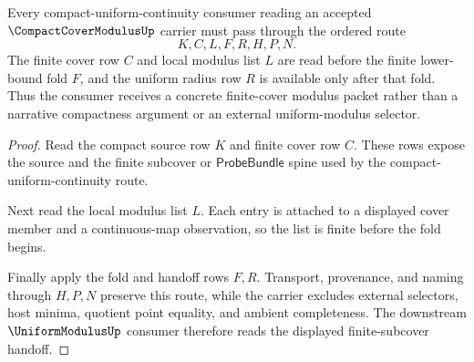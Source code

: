 \begin{theorem}
\label{thm:compact-cover-modulus-finite-subcover-handoff}
Every compact-uniform-continuity consumer reading an accepted $\CompactCoverModulusUp$ carrier must pass through the ordered route
$$
K,C,L,F,R,H,P,N .
$$
The finite cover row $C$ and local modulus list $L$ are read before the finite lower-bound fold $F$, and the uniform radius row $R$ is available only after that fold. Thus the consumer receives a concrete finite-cover modulus packet rather than a narrative compactness argument or an external uniform-modulus selector.
\end{theorem}
\begin{proof}
Read the compact source row $K$ and finite cover row $C$. These rows expose the source and the finite subcover or $\mathsf{ProbeBundle}$ spine used by the compact-uniform-continuity route.

Next read the local modulus list $L$. Each entry is attached to a displayed cover member and a continuous-map observation, so the list is finite before the fold begins.

Finally apply the fold and handoff rows $F,R$. Transport, provenance, and naming through $H,P,N$ preserve this route, while the carrier excludes external selectors, host minima, quotient point equality, and ambient completeness. The downstream $\UniformModulusUp$ consumer therefore reads the displayed finite-subcover handoff.
\end{proof}



